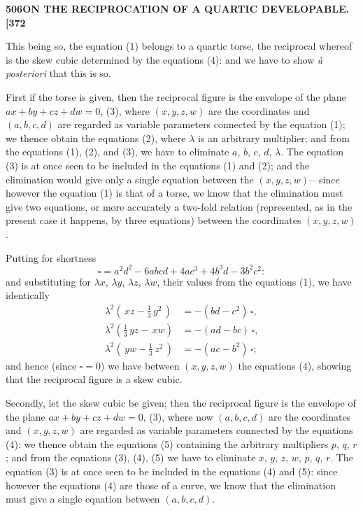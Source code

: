 \documentclass[11pt,a4paper]{article}
\begin{document}
\newpage
\noindent\textbf{506\hspace{1em}ON THE RECIPROCATION OF A QUARTIC DEVELOPABLE.\hfill[372}

\vspace{12pt}

\noindent
This being so, the equation (1) belongs to a quartic torse, the reciprocal whereof is the skew cubic determined by the equations (4): and we have to show \textit{\`a posteriori} that this is so.

First if the torse is given, then the reciprocal figure is the envelope of the plane $ax + by + cz + dw = 0$, (3), where $(x, y, z, w)$ are the coordinates and $(a, b, c, d)$ are regarded as variable parameters connected by the equation (1); we thence obtain the equations (2), where $\lambda$ is an arbitrary multiplier; and from the equations (1), (2), and (3), we have to eliminate $a$, $b$, $c$, $d$, $\lambda$. The equation (3) is at once seen to be included in the equations (1) and (2); and the elimination would give only a single equation between the $(x, y, z, w)$---since however the equation (1) is that of a torse, we know that the elimination must give two equations, or more accurately a two-fold relation (represented, as in the present case it happens, by three equations) between the coordinates $(x, y, z, w)$.

Putting for shortness
\[
\square = a^{2}d^{2} - 6abcd + 4ac^{3} + 4b^{3}d - 3b^{2}c^{2}:
\]
and substituting for $\lambda x$, $\lambda y$, $\lambda z$, $\lambda w$, their values from the equations (1), we have identically
\begin{align*}
\lambda^{2}(\,xz - \tfrac{1}{3}\,y^{2}\,) &= -(bd - c^{2})\,\square,\\
\lambda^{2}(\tfrac{1}{3}\,yz - \,xw) &= -(ad - bc)\,\square,\\
\lambda^{2}(\,yw - \tfrac{1}{3}\,z^{2}\,) &= -(ac - b^{2})\,\square;
\end{align*}
and hence (since $\square = 0$) we have between $(x, y, z, w)$ the equations (4), showing that the reciprocal figure is a skew cubic.

Secondly, let the skew cubic be given; then the reciprocal figure is the envelope of the plane $ax + by + cz + dw = 0$, (3), where now $(a, b, c, d)$ are the coordinates and $(x, y, z, w)$ are regarded as variable parameters connected by the equations (4): we thence obtain the equations (5) containing the arbitrary multipliers $p$, $q$, $r$; and from the equations (3), (4), (5) we have to eliminate $x$, $y$, $z$, $w$, $p$, $q$, $r$. The equation (3) is at once seen to be included in the equations (4) and (5): since however the equations (4) are those of a curve, we know that the elimination must give a single equation between $(a, b, c, d)$.
\end{document}

